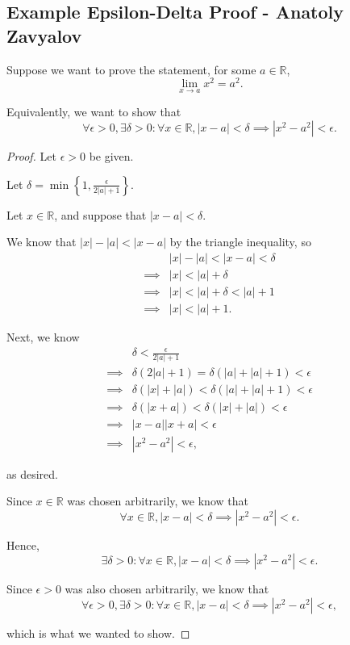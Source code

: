 \documentclass[12pt]{article}
\begin{document}
\begin{center}
    \section*{Example Epsilon-Delta Proof - Anatoly Zavyalov}
\end{center}

Suppose we want to prove the statement, for some \(a \in \mathbb{R}\),
\[
    \lim_{x \to a} x^2 = a^2.
\]

Equivalently, we want to show that
\[
    \forall \epsilon > 0, \exists \delta > 0: \forall x \in \mathbb{R}, |x-a| < \delta \implies \left| x^2 - a^2 \right| < \epsilon. 
\]

\begin{proof}[Proof]
    

Let \(\epsilon > 0\) be given.

Let \(\delta = \displaystyle \min \left\{ 1, \frac{\epsilon}{2|a| + 1} \right\} \).

Let \(x \in \mathbb{R}\), and suppose that \(|x-a| < \delta\).

We know that \(|x|-|a| < |x-a|\) by the triangle inequality, so
\begin{align*}
    &|x|-|a| < |x-a| < \delta \\ 
    \implies& |x| < |a| + \delta \\ 
    \implies& |x| < |a| + \delta < |a| + 1 \tag*{as \(\delta < 1\)} \\ 
    \implies& |x| < |a| + 1.
\end{align*}

Next, we know
\begin{align*}
    &\delta < \frac{\epsilon}{2 |a| + 1} \\ 
    \implies& \delta \left( 2|a| + 1 \right) = \delta \left( |a| + |a| + 1 \right) < \epsilon \\ 
    \implies& \delta \left( |x| + |a| \right) < \delta \left( |a| + |a| + 1 \right) < \epsilon \\ 
    \implies& \delta \left( |x+a| \right) < \delta \left( |x| + |a| \right) < \epsilon \tag*{by the triangle inequality}\\ 
    \implies& |x-a||x+a| < \epsilon \tag*{as \(|x-a| < \delta\)} \\ 
    \implies& |x^2 - a^2| < \epsilon,
\end{align*}

as desired.

Since \(x \in \mathbb{R}\) was chosen arbitrarily, we know that
\[
    \forall x \in \mathbb{R}, |x-a| < \delta \implies \left| x^2 - a^2 \right| < \epsilon.
\]

Hence,
\[
    \exists \delta > 0: \forall x \in \mathbb{R}, |x-a| < \delta \implies \left| x^2 - a^2 \right| < \epsilon.
\]

Since \(\epsilon > 0\) was also chosen arbitrarily, we know that
\[
    \forall \epsilon > 0, \exists \delta > 0: \forall x \in \mathbb{R}, |x-a| < \delta \implies \left| x^2 - a^2 \right| < \epsilon,
\]

which is what we wanted to show.


\end{proof}
\end{document}

